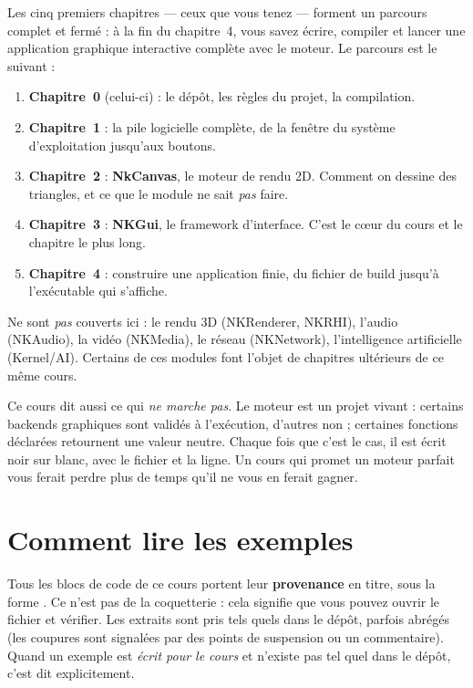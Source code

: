 Les cinq premiers chapitres — ceux que vous tenez — forment un parcours complet
et fermé : à la fin du chapitre~4, vous savez écrire, compiler et lancer une
application graphique interactive complète avec le moteur. Le parcours est le
suivant :

\begin{enumerate}
  \item \textbf{Chapitre~0} (celui-ci) : le dépôt, les règles du projet, la
        compilation.
  \item \textbf{Chapitre~1} : la pile logicielle complète, de la fenêtre du
        système d'exploitation jusqu'aux boutons.
  \item \textbf{Chapitre~2} : \textbf{NkCanvas}, le moteur de rendu 2D. Comment
        on dessine des triangles, et ce que le module ne sait \emph{pas} faire.
  \item \textbf{Chapitre~3} : \textbf{NKGui}, le framework d'interface. C'est le
        cœur du cours et le chapitre le plus long.
  \item \textbf{Chapitre~4} : construire une application finie, du fichier de
        build jusqu'à l'exécutable qui s'affiche.
\end{enumerate}

Ne sont \emph{pas} couverts ici : le rendu 3D (NKRenderer, NKRHI), l'audio
(NKAudio), la vidéo (NKMedia), le réseau (NKNetwork), l'intelligence
artificielle (Kernel/AI). Certains de ces modules font l'objet de chapitres
ultérieurs de ce même cours.

\begin{nkretenir}
Ce cours dit aussi ce qui \emph{ne marche pas}. Le moteur est un projet vivant :
certains backends graphiques sont validés à l'exécution, d'autres non ; certaines
fonctions déclarées retournent une valeur neutre. Chaque fois que c'est le cas,
il est écrit noir sur blanc, avec le fichier et la ligne. Un cours qui promet un
moteur parfait vous ferait perdre plus de temps qu'il ne vous en ferait gagner.
\end{nkretenir}

\section{Comment lire les exemples}

Tous les blocs de code de ce cours portent leur \textbf{provenance} en titre,
sous la forme . Ce n'est pas de la
coquetterie : cela signifie que vous pouvez ouvrir le fichier et vérifier. Les
extraits sont pris tels quels dans le dépôt, parfois abrégés (les coupures sont
signalées par des points de suspension ou un commentaire). Quand un exemple est
\emph{écrit pour le cours} et n'existe pas tel quel dans le dépôt, c'est dit
explicitement.

